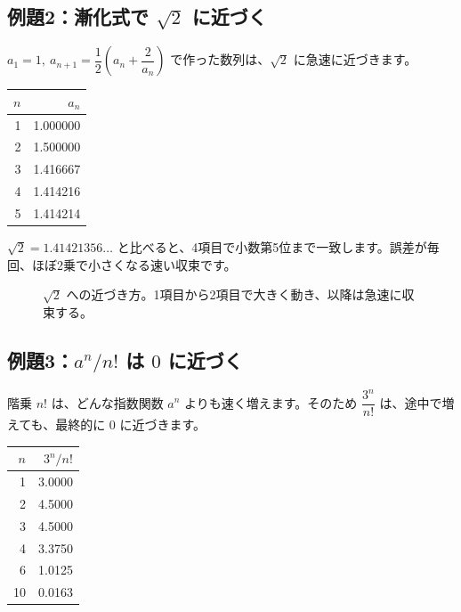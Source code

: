\documentclass[a4paper,11pt,openany]{ltjsbook}
\begin{document}
\subsection*{例題2：漸化式で $\sqrt2$ に近づく}

$a_1=1,\ a_{n+1}=\dfrac12\left(a_n+\dfrac2{a_n}\right)$ で作った数列は、$\sqrt2$ に急速に近づきます。

\begin{center}
\begin{tabular}{rr}
\toprule
$n$ & $a_n$\\
\midrule
1 & 1.000000\\
2 & 1.500000\\
3 & 1.416667\\
4 & 1.414216\\
5 & 1.414214\\
\bottomrule
\end{tabular}
\end{center}

$\sqrt2=1.41421356\ldots$ と比べると、4項目で小数第5位まで一致します。誤差が毎回、ほぼ2乗で小さくなる速い収束です。

\begin{figure}[htbp]
\centering
{}
\caption{$\sqrt2$ への近づき方。1項目から2項目で大きく動き、以降は急速に収束する。}
\end{figure}

\subsection*{例題3：$a^n/n!$ は $0$ に近づく}

階乗 $n!$ は、どんな指数関数 $a^n$ よりも速く増えます。そのため $\dfrac{3^n}{n!}$ は、途中で増えても、最終的に $0$ に近づきます。

\begin{center}
\begin{tabular}{rr}
\toprule
$n$ & $3^n/n!$\\
\midrule
1 & 3.0000\\
2 & 4.5000\\
3 & 4.5000\\
4 & 3.3750\\
6 & 1.0125\\
10 & 0.0163\\
\bottomrule
\end{tabular}
\end{center}
\end{document}
